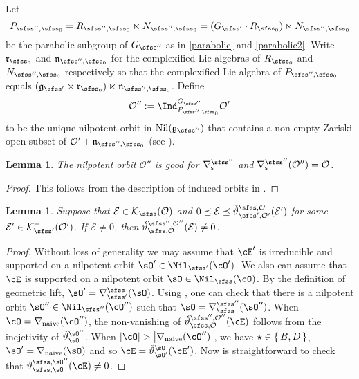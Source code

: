 \documentclass[12pt,a4paper]{amsart}
\def\abs#1{\left|{#1}\right|}
\newcommand{\CE}{{\mathcal {E}}}
\newcommand{\CK}{{\mathcal {K}}}
\newcommand{\CO}{{\mathcal {O}}}
\newcommand{\g}{\mathfrak g}
\def\DD{\nabla}
\numberwithin{equation}{section}
\newtheorem{lem}[thm]{Lemma}
\theoremstyle{remark}
\def\DDn{\DD_{\mathrm{naive}}}
\begin{document}
Let 
\[
  P_{\sfss'',\sfss_0}=R_{\sfss'',\sfss_0}\ltimes N_{\sfss'',\sfss_0}=(G_{\sfss'}\cdot R_{\sfss_0})\ltimes N_{\sfss'',\sfss_0}
\]
be the parabolic subgroup of $G_{\sfss''}$ as in \eqref{parabolic} and \eqref{parabolic2}. Write $\mathfrak r_{\sfss_0}$ and $\mathfrak n_{\sfss'',\sfss_0}$ for the complexified Lie algebras of $R_{\sfss_0}$ and $N_{\sfss'',\sfss_0}$ respectively so that  the complexified Lie algebra of $P_{\sfss'', \sfss_0}$ equals $(\g_{\sfss'}\times \mathfrak r_{\sfss_0})\ltimes \mathfrak n_{\sfss'',\sfss_0}$.   
Define
\[
  \CO'':= \Ind_{P_{\sfss'',\sfss_0}}^{G_{\sfss''}}  \CO'%
\]
to be the unique nilpotent orbit in $\mathrm{Nil}(\g_{\sfss''})$ that contains a non-empty Zariski open subset of  $
  \CO'+\mathfrak n_{\sfss'',\sfss_0}$ (see \cite[Theorem 7.1.1]{CM}).


\begin{lem}
The nilpotent orbit $\CO''$ is good for  $\nabla_\mathsf s^{\sfss''}$ and $\nabla_\mathsf s^{\sfss''}(\CO'')=\CO$.  
\end{lem}
\begin{proof}
This follows from the description of induced orbits in \cite[Section 7.3]{CM}. 
\end{proof}


\begin{lem}\label{lem74}
Suppose that $\CE\in \CK_{\sfss}(\CO)$ and $0\preceq \CE\preceq \check \vartheta_{\sfss', \CO'}^{\sfss, \CO}(\CE')$ for some $\CE'\in \CK^+_{\sfss'}(\CO')$. If $\CE\neq 0$, then  $\check \vartheta_{\sfss, \CO}^{\sfss'', \CO''}(\CE)\neq 0$.
\end{lem}
\begin{proof}
  Without loss of generality we may assume that $\cE'$ is irreducible and
  supported on a nilpotent orbit $\sO'\in \Nil_{\sfss'}(\cO')$. 
  We also can assume that $\cE$ is supported on a nilpotent orbit $\sO\in \Nil_\sfss(\cO)$. 
  By the definition of geometric lift, $\sO'=\DDss(\sO)$. Using , 
  one can check that there is a nilpotent orbit $\sO''\in \Nil_{\sfss''}(\cO'')$ such that 
  $\sO = \DD_{\sfss}^{\sfss''}(\sO'')$. 
  When $\cO = \DDn(\cO'')$, the non-vanishing of $\check \vartheta_{\sfss, \CO}^{\sfss'', \CO''}(\cE)$
  follows from the inejctivity of $\dlift_{\sO}^{\sO''}$. 
  When $\abs{\cO} > \abs{\DDn(\cO'')}$, we have $\star \in \set{B,D}$, $\sO'=\DDn(\sO)$
  and so $\cE = \dlift_{\sO'}^{\sO}(\cE')$.  
  Now is straightforward to check that $\vartheta_{\sfss,\sO}^{\sfss,\sO''}(\cE) \neq 0$.
\end{proof}
\end{document}
